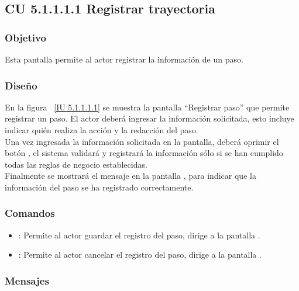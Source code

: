 \subsection{CU 5.1.1.1.1 Registrar trayectoria}

\subsubsection{Objetivo}
	
	Esta pantalla permite al actor registrar la información de un paso.

\subsubsection{Diseño}

    En la figura ~\ref{IU 5.1.1.1.1} se muestra la pantalla ``Registrar paso'' que permite registrar un paso. El actor deberá ingresar la información solicitada, 
    esto incluye indicar quién realiza la acción y la redacción del paso.\\
    
    
    Una vez ingresada la información solicitada en la pantalla, deberá oprimir el botón 
    , el sistema validará y registrará la información sólo si se han cumplido todas las reglas de negocio establecidas.  \\
    
    Finalmente se mostrará el mensaje  en la pantalla ,
    para indicar que la información del paso
    se ha registrado correctamente.        




\subsubsection{Comandos}
\begin{itemize}
	\item {}: Permite al actor guardar el registro del paso, dirige a la pantalla .
	\item {}: Permite al actor cancelar el registro del paso, dirige a la pantalla .
\end{itemize}

\subsubsection{Mensajes}

